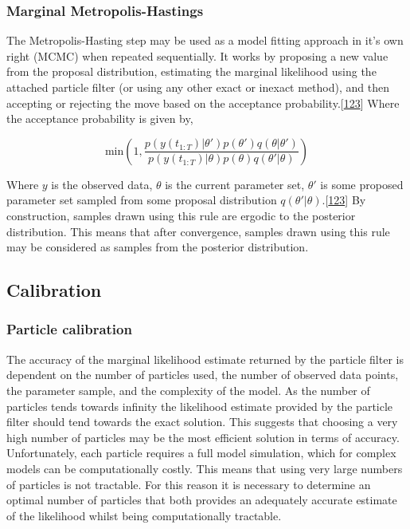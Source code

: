 \documentclass[11pt,twoside]{bristolthesis}
\begin{document}
  \hypertarget{marginal-metropolis-hastings}{%
  \subsubsection{Marginal Metropolis-Hastings}\label{marginal-metropolis-hastings}}
  
  The Metropolis-Hasting step may be used as a model fitting approach in it's own right (MCMC) when repeated sequentially. It works by proposing a new value from the proposal distribution, estimating the marginal likelihood using the attached particle filter (or using any other exact or inexact method), and then accepting or rejecting the move based on the acceptance probability.{[}\protect\hyperlink{ref-Murray2015}{123}{]} Where the acceptance probability is given by,
  
  \[ \text{min} \left(1,  \frac{p(y(t_{1:T}) |\theta')p(\theta')q(\theta | \theta')}{p(y(t_{1:T}) |\theta)p(\theta)q(\theta' | \theta)}\right) \]
  
  Where \(y\) is the observed data, \(\theta\) is the current parameter set, \(\theta'\) is some proposed parameter set sampled from some proposal distribution \(q(\theta' | \theta)\).{[}\protect\hyperlink{ref-Murray2015}{123}{]} By construction, samples drawn using this rule are ergodic to the posterior distribution. This means that after convergence, samples drawn using this rule may be considered as samples from the posterior distribution.
  
  \hypertarget{calibration}{%
  \subsection{Calibration}\label{calibration}}
  
  \hypertarget{particle-calibration}{%
  \subsubsection{Particle calibration}\label{particle-calibration}}
  
  The accuracy of the marginal likelihood estimate returned by the particle filter is dependent on the number of particles used, the number of observed data points, the parameter sample, and the complexity of the model. As the number of particles tends towards infinity the likelihood estimate provided by the particle filter should tend towards the exact solution. This suggests that choosing a very high number of particles may be the most efficient solution in terms of accuracy. Unfortunately, each particle requires a full model simulation, which for complex models can be computationally costly. This means that using very large numbers of particles is not tractable. For this reason it is necessary to determine an optimal number of particles that both provides an adequately accurate estimate of the likelihood whilst being computationally tractable.
  
\end{document}
